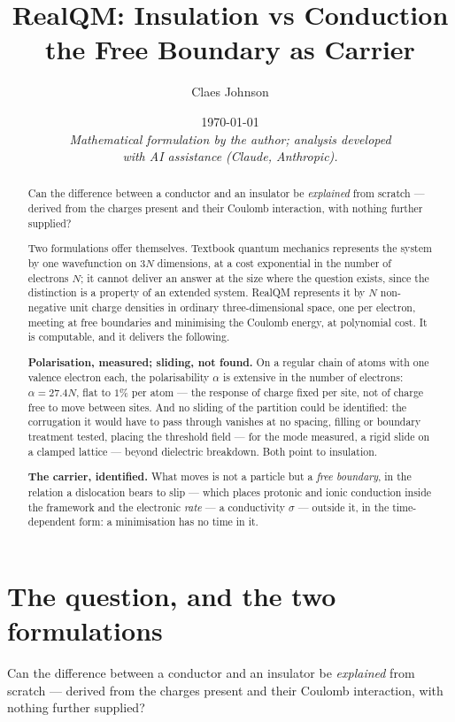 \documentclass[11pt]{article}
\title{RealQM: Insulation vs Conduction\\ \large the Free Boundary as Carrier}
\author[1]{Claes Johnson}
\affil[1]{KTH Royal Institute of Technology, SE-100 44 Stockholm, Sweden \\
\texttt{claesjohnson@gmail.com}}
\date{\today \\[0.4em]
\small\textit{Mathematical formulation by the author; analysis developed} \\
\small\textit{with AI assistance (Claude, Anthropic).}}
\begin{document}
\maketitle

\begin{abstract}
\noindent Can the difference between a conductor and an insulator be \emph{explained} from scratch
--- derived from the charges present and their Coulomb interaction, with nothing further supplied?

Two formulations offer themselves. Textbook quantum mechanics represents the system by one
wavefunction on $3N$ dimensions, at a cost exponential in the number of electrons $N$; it cannot deliver
an answer at the size where the question exists, since the distinction is a property of an extended
system. RealQM represents it by $N$ non-negative unit charge densities in ordinary three-dimensional
space, one per electron, meeting at free boundaries and minimising the Coulomb energy, at polynomial
cost. It is computable, and it delivers the following.

\textbf{Polarisation, measured; sliding, not found.} On a regular chain of atoms with one valence
electron each, the polarisability $\alpha$ is extensive in the number of electrons: $\alpha=27.4N$, flat to $1\%$ per atom --- the response of charge fixed per
site, not of charge free to move between sites. And no sliding of the partition could be identified:
the corrugation it would have to pass through vanishes at no spacing, filling or boundary treatment
tested, placing the threshold field --- for the mode measured, a rigid slide on a clamped lattice
--- beyond dielectric breakdown. Both point to insulation.

\textbf{The carrier, identified.} What moves is not a particle but a \emph{free boundary}, in the
relation a dislocation bears to slip --- which places protonic and ionic conduction inside the
framework and the electronic \emph{rate} --- a conductivity $\sigma$ --- outside it, in the
time-dependent form: a minimisation has no time in it.
\end{abstract}


\section{The question, and the two formulations}

Can the difference between a conductor and an insulator be \emph{explained} from scratch --- derived
from the charges present and their Coulomb interaction, with nothing further supplied?
\end{document}
